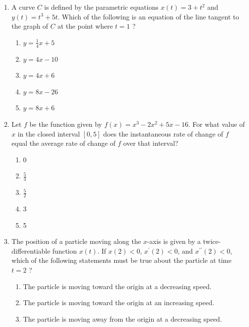 \documentclass{article}
\begin{document}
\begin{enumerate}
	\item
	\begin{minipage}[t]{\linewidth}
		A curve \(C\) is defined by the parametric equations \(x(t)=3+t^{2}\)
and \(y(t)=t^{3}+5 t\). Which of the following is an equation of the
line tangent to the graph of \(C\) at the point where \(t=1\) ?
\vspace{1em}
		\begin{enumerate}
		\itemsep1em
			\item \(y=\frac{1}{4} x+5\)
			\item \(y=4 x-10\)
			\item \(y=4 x+6\)
			\item \(y=8 x-26\)
			\item \(y=8 x+6\)
		\end{enumerate}
	\end{minipage}
	\item
	\begin{minipage}[t]{\linewidth}
		Let \(f\) be the function given by \(f(x)=x^{3}-2 x^{2}+5 x-16\). For
what value of \(x\) in the closed interval \([0,5]\) does the
instantaneous rate of change of \(f\) equal the average rate of change
of \(f\) over that interval?
\vspace{1em}
		\begin{enumerate}
		\itemsep1em
			\item 0
			\item \(\frac{5}{3}\)
			\item \(\frac{5}{2}\)
			\item 3
			\item 5
		\end{enumerate}
	\end{minipage}
	\item
	\begin{minipage}[t]{\linewidth}
		The position of a particle moving along the \(x\)-axis is given by a
twice-differentiable function \(x(t)\). If \(x(2)<0\),
\(x^{\prime}(2)<0\), and \(x^{\prime \prime}(2)<0\), which of the
following statements must be true about the particle at time \(t=2\) ?
\vspace{1em}
		\begin{enumerate}
		\itemsep1em
			\item The particle is moving toward the origin at a decreasing speed.
			\item The particle is moving toward the origin at an increasing speed.
			\item The particle is moving away from the origin at a decreasing speed.

\end{enumerate}
\end{minipage}
\end{enumerate}
\end{document}
